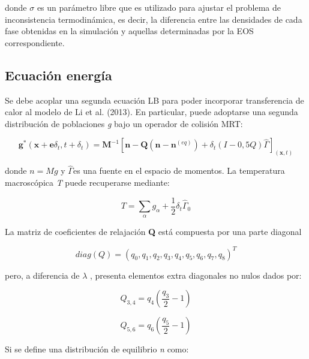 donde $\sigma$ es un parámetro libre que es utilizado para ajustar el problema de inconsistencia termodinámica,
es decir, la diferencia entre las densidades de cada fase obtenidas en la simulación y aquellas determinadas por la EOS correspondiente.

\subsection{Ecuación energía}

Se debe acoplar una segunda ecuación LB para poder incorporar transferencia de calor al modelo de Li et al. (2013).
En particular, puede adoptarse una segunda distribución de poblaciones \textit{g} bajo un operador de colisión MRT:

\begin{equation}
    \mathbf{g^*}(\mathbf{x} + \mathbf{e} \delta_{t} ,t + \delta_{t}) = \mathbf{M}^{-1} \left[ \mathbf{n} - \mathbf{Q}(\mathbf{n} - \mathbf{n}^{(eq)}) + \delta_{t} \left( I - 0,5 Q \right) \hat{\Gamma}  \right]_{(\mathbf{x},t)}
    \label{eq:fieldenergy}
\end{equation}

donde $n = M g$ y $\hat{\Gamma}$es una fuente en el espacio de momentos. La temperatura macroscópica \textit{T}
puede recuperarse mediante:

\begin{equation}
    T = \sum_{\alpha} g_{\alpha} + \frac{1}{2} \delta_{t} {\hat{\Gamma}}_{0}
\end{equation}

La matriz de coeficientes de relajación \textbf{Q} está compuesta por una parte diagonal

\begin{equation}
    \textit{diag} (Q) = {( q_{0} , q_{1} , q_{2} , q_{3} , q_{4} , q_{5} , q_{6} , q_{7} , q_{8} )}^{T}
\end{equation}

pero, a diferencia de $\lambda$ , presenta elementos extra diagonales no nulos dados por:

\begin{equation}
    Q_{3,4} = q_{4} \left( \frac{q_{3}}{2} - 1 \right)
\end{equation}

\begin{equation}
    Q_{5,6} = q_{6} \left( \frac{q_{5}}{2} - 1 \right)
\end{equation}

Si se define una distribución de equilibrio \textit{n} como:


